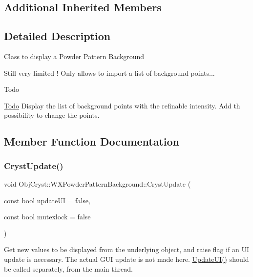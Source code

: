 \subsection*{Additional Inherited Members}


\subsection{Detailed Description}
Class to display a Powder Pattern Background

Still very limited ! Only allows to import a list of background points... \begin{DoxyRefDesc}{Todo}
\item[\mbox{\hyperlink{todo__todo000003}{Todo}}]Display the list of background points with the refinable intensity. Add th possibility to change the points. \end{DoxyRefDesc}


\subsection{Member Function Documentation}
\mbox{\label{class_obj_cryst_1_1_w_x_powder_pattern_background_a88a6987f3747b2538572e91f04b8f08d}} 
\subsubsection{\texorpdfstring{CrystUpdate()}{CrystUpdate()}}
{\footnotesize\ttfamily void Obj\+Cryst\+::\+W\+X\+Powder\+Pattern\+Background\+::\+Cryst\+Update (\begin{DoxyParamCaption}\item[{const bool}]{update\+UI = {\ttfamily false},  }\item[{const bool}]{mutexlock = {\ttfamily false} }\end{DoxyParamCaption})\hspace{0.3cm}{\ttfamily [virtual]}}

Get new values to be displayed from the underlying object, and raise flag if an UI update is necessary. The actual G\+UI update is not made here. \mbox{\hyperlink{class_obj_cryst_1_1_w_x_powder_pattern_background_a7e54d0ef518f44f897d7363e7f96e4ae}{Update\+U\+I()}} should be called separately, from the main thread.


